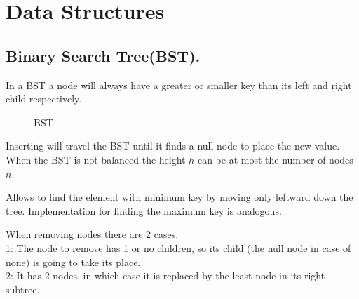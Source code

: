 \documentclass[12pt]{article}
\begin{document}
\tableofcontents
\section{Data Structures}
\subsection{Binary Search Tree(BST).}
In a BST a node will always have a greater or smaller key than its left and
right child respectively.
\begin{figure}[!ht]
  \centering
  \caption{BST}
\end{figure}

\noindent\begin{minipage}{\linewidth}

\end{minipage}

\noindent\begin{minipage}{\linewidth}

\end{minipage}
Inserting will travel the BST until it finds a null node to place the new value.
When the BST is not balanced the height $h$ can be at most the number of
nodes $n$.

\noindent\begin{minipage}{\linewidth}

\end{minipage}
Allows to find the element with minimum key by moving only leftward down the
tree. Implementation for finding the maximum key is analogous.\\

\noindent\begin{minipage}{\linewidth}

\end{minipage}
When removing nodes there are 2 cases.\\
1: The node to remove has 1 or no children, so its child (the null node in case
of none) is going to take its place.\\
2: It has 2 nodes, in which case it is replaced by the least node in its right
subtree.\\
\end{document}
